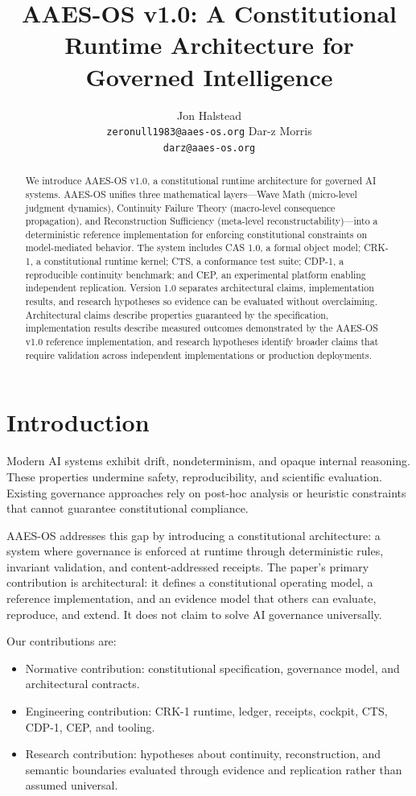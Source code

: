 \documentclass{article}
\title{AAES-OS v1.0: A Constitutional Runtime Architecture for Governed Intelligence}
\author{
  Jon Halstead \\
  \texttt{zeronull1983@aaes-os.org}
  \And
  Dar-z Morris \\
  \texttt{darz@aaes-os.org}
}
\begin{document}
\maketitle

\begin{abstract}
We introduce AAES-OS v1.0, a constitutional runtime architecture for governed AI systems. AAES-OS unifies three mathematical layers---Wave Math (micro-level judgment dynamics), Continuity Failure Theory (macro-level consequence propagation), and Reconstruction Sufficiency (meta-level reconstructability)---into a deterministic reference implementation for enforcing constitutional constraints on model-mediated behavior. The system includes CAS 1.0, a formal object model; CRK-1, a constitutional runtime kernel; CTS, a conformance test suite; CDP-1, a reproducible continuity benchmark; and CEP, an experimental platform enabling independent replication. Version 1.0 separates architectural claims, implementation results, and research hypotheses so evidence can be evaluated without overclaiming. Architectural claims describe properties guaranteed by the specification, implementation results describe measured outcomes demonstrated by the AAES-OS v1.0 reference implementation, and research hypotheses identify broader claims that require validation across independent implementations or production deployments.
\end{abstract}

\section{Introduction}
Modern AI systems exhibit drift, nondeterminism, and opaque internal reasoning. These properties undermine safety, reproducibility, and scientific evaluation. Existing governance approaches rely on post-hoc analysis or heuristic constraints that cannot guarantee constitutional compliance.

AAES-OS addresses this gap by introducing a constitutional architecture: a system where governance is enforced at runtime through deterministic rules, invariant validation, and content-addressed receipts. The paper's primary contribution is architectural: it defines a constitutional operating model, a reference implementation, and an evidence model that others can evaluate, reproduce, and extend. It does not claim to solve AI governance universally.

Our contributions are:
\begin{itemize}
    \item Normative contribution: constitutional specification, governance model, and architectural contracts.
    \item Engineering contribution: CRK-1 runtime, ledger, receipts, cockpit, CTS, CDP-1, CEP, and tooling.
    \item Research contribution: hypotheses about continuity, reconstruction, and semantic boundaries evaluated through evidence and replication rather than assumed universal.
\end{itemize}
\end{document}
